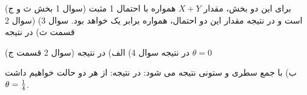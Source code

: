 \documentclass[10pt,letterpaper]{article}
\begin{document}
(سوال 1 بخش ث و ج) برای این دو بخش، مقدار $X+Y$ همواره با احتمال 1 مثبت است و در نتیجه مقدار این دو احتمال، همواره برابر یک خواهد بود.
\newline
\newline
سوال 3) (سوال 2 قسمت ث)
در نتیجه

(سوال 2 قسمت ج)
در نتیجه
\newline\newline
سوال 4) الف)
در نتیجه $\theta=0$

ب) با جمع سطری و ستونی نتیجه می شود:
 در نتیجه:
از هر دو حالت خواهیم داشت $\theta={1\over 4}$.
\end{document}
